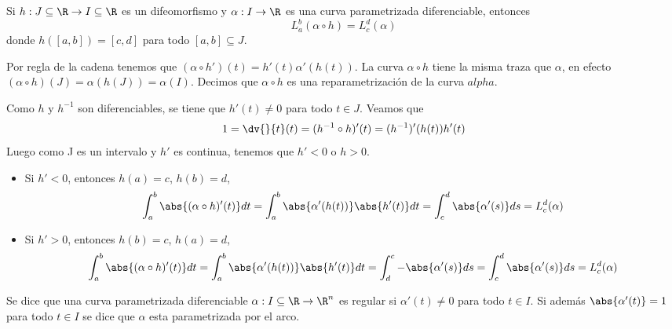 \documentclass{article}
\begin{document}
\begin{cor}
    Si $h:J\subseteq\R\to I\subseteq\R$ es un difeomorfismo y $\alpha: I\to\R$ es una curva 
    parametrizada diferenciable, entonces
    \begin{equation*}
        L_{a}^{b}(\alpha\circ h)=L_{c}^{d}(\alpha)
    \end{equation*}
    donde $h([a,b])=[c,d]$ para todo $[a,b]\subseteq J$.
\end{cor}

\noindent Por regla de la cadena tenemos que $(\alpha\circ h')(t)=h'(t)\alpha'(h(t))$. La curva 
$\alpha\circ h$ tiene la misma traza que $\alpha$, en efecto $(\alpha\circ h)(J)=\alpha(h(J))=
\alpha(I)$. Decimos que $\alpha\circ h$ es una reparametrización de la curva $alpha$.

\begin{dem}
    Como $h$ y $h^{-1}$ son diferenciables, se tiene que $h'(t)\neq0$ para todo $t\in J$. Veamos
    que
    \begin{equation*}
        1=\dv{}{t}(t)=(h^{-1}\circ h)'(t)=(h^{-1})'(h(t))h'(t)
    \end{equation*}
    Luego como J es un intervalo y $h'$ es continua, tenemos que $h'<0$ o $h>0$.
    \begin{itemize}
        
        \item Si $h'<0$, entonces $h(a)=c$, $h(b)=d$,
        \begin{equation*}
            \int_{a}^{b}\abs{(\alpha\circ h)'(t)}dt=\int_{a}^{b}\abs{\alpha'(h(t))}\abs{h'(t)}dt=
            \int_{c}^{d}\abs{\alpha'(s)}ds=L_{c}^{d}(\alpha)
        \end{equation*}

        \item Si $h'>0$, entonces $h(b)=c$, $h(a)=d$,
        \begin{equation*}
            \int_{a}^{b}\abs{(\alpha\circ h)'(t)}dt=\int_{a}^{b}\abs{\alpha'(h(t))}\abs{h'(t)}dt=
            \int_{d}^{c}-\abs{\alpha'(s)}ds=\int_{c}^{d}\abs{\alpha'(s)}ds=L_{c}^{d}(\alpha)
        \end{equation*}

    \end{itemize}
\end{dem}

\begin{dfn}
    Se dice que una curva parametrizada diferenciable $\alpha: I\subseteq\R\to\R^{n}$ es regular si
    $\alpha'(t)\neq0$ para todo $t\in I$. Si además $\abs{\alpha'(t)}=1$ para todo $t\in I$ se dice
    que $\alpha$ esta parametrizada por el arco.
\end{dfn}
\end{document}
